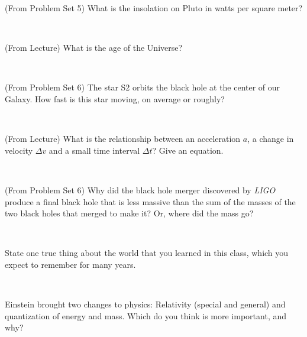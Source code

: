 \documentclass[12pt, letterpaper]{article}
\begin{document}
\begin{problem}
(From Problem Set 5)
What is the insolation on Pluto in watts per square meter?
\end{problem}

\vfill ~

\clearpage

\begin{problem}
(From Lecture)
What is the age of the Universe?
\end{problem}

\vfill ~

\begin{problem}
(From Problem Set 6)
The star S2 orbits the black hole at the center of our Galaxy.
How fast is this star moving, on average or roughly?
\end{problem}

\vfill ~

\begin{problem}
(From Lecture)
What is the relationship between an acceleration $a$, a change in velocity $\Delta v$ and a small time interval $\Delta t$? Give an equation.
\end{problem}

\vfill ~

\begin{problem}
(From Problem Set 6)
Why did the black hole merger discovered by \textsl{LIGO} produce a final black hole that is less massive than the sum of the masses of the two black holes that merged to make it? Or, where did the mass go?
\end{problem}

\vfill ~

\clearpage

\begin{problem}
State one true thing about the world that you learned in this class,
which you expect to remember for many years.
\end{problem}

\vfill ~

\begin{problem}
Einstein brought two changes to physics: Relativity (special and general) and
quantization of energy and mass. Which do you think is more important, and why?
\end{problem}

\vfill ~

~

\vfill ~

~

\vfill ~
\end{document}
